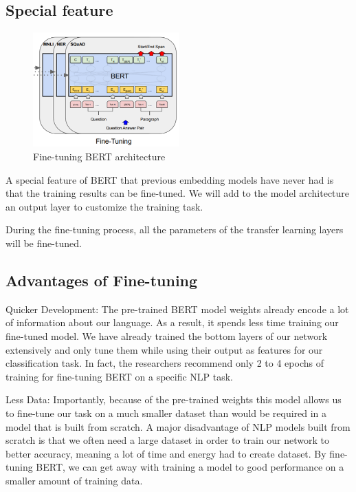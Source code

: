 \documentclass[11pt]{article}
\begin{document}
\subsection{Special feature}

\begin{figure}[h]
	\centering
	\includegraphics[width=0.5\textwidth]{fig0.png}
	\caption{Fine-tuning BERT architecture}
	\label{fig1}
\end{figure}

A special feature of BERT that previous embedding models have never had is that the training results can be fine-tuned. We will add to the model architecture an output layer to customize the training task.

During the fine-tuning process, all the parameters of the transfer learning layers will be fine-tuned.
\cite{devlin2018bert}

\subsection{Advantages of Fine-tuning}

\quad Quicker Development: The pre-trained BERT model weights already encode a lot of information about our language. As a result, it spends less time training our fine-tuned model. We have already trained the bottom layers of our network extensively and only tune them while using their output as features for our classification task. In fact, the researchers recommend only 2 to 4 epochs of training for fine-tuning BERT on a specific NLP task.

Less Data: Importantly, because of the pre-trained weights this model allows us to fine-tune our task on a much smaller dataset than would be required in a model that is built from scratch. A major disadvantage of NLP models built from scratch is that we often need a large dataset in order to train our network to better accuracy, meaning a lot of time and energy had to create dataset. By fine-tuning BERT, we can get away with training a model to good performance on a smaller amount of training data.
\end{document}
